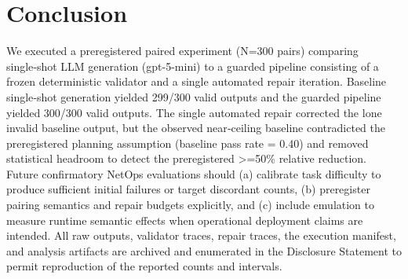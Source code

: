\documentclass[conference]{IEEEtran}
\begin{document}
\section{Conclusion}
We executed a preregistered paired experiment (N=300 pairs) comparing single‑shot LLM generation (gpt-5-mini) to a guarded pipeline consisting of a frozen deterministic validator and a single automated repair iteration. Baseline single‑shot generation yielded 299/300 valid outputs and the guarded pipeline yielded 300/300 valid outputs. The single automated repair corrected the lone invalid baseline output, but the observed near‑ceiling baseline contradicted the preregistered planning assumption (baseline pass rate = 0.40) and removed statistical headroom to detect the preregistered >=50\% relative reduction. Future confirmatory NetOps evaluations should (a) calibrate task difficulty to produce sufficient initial failures or target discordant counts, (b) preregister pairing semantics and repair budgets explicitly, and (c) include emulation to measure runtime semantic effects when operational deployment claims are intended. All raw outputs, validator traces, repair traces, the execution manifest, and analysis artifacts are archived and enumerated in the Disclosure Statement to permit reproduction of the reported counts and intervals.
\end{document}
